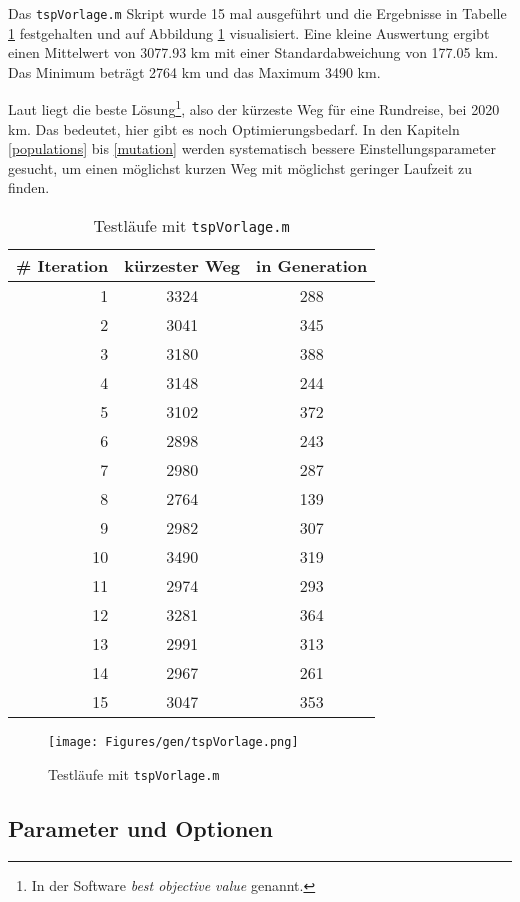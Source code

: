 Das {\tt tspVorlage.m} Skript wurde 15 mal ausgeführt und die Ergebnisse in
Tabelle \ref{testlaeufe} festgehalten und auf Abbildung \ref{fig.testlaeufe}
visualisiert.
Eine kleine Auswertung ergibt einen Mittelwert von 3077.93 km mit
einer Standardabweichung von 177.05 km.
Das Minimum beträgt 2764 km und das Maximum 3490 km.

Laut \cite{aufg} liegt die beste
Lösung\footnote{In der Software \emph{best objective value} genannt.},
also der kürzeste Weg für eine Rundreise, bei 2020 km.
Das bedeutet, hier gibt es noch Optimierungsbedarf.
In den Kapiteln \ref{populations} bis \ref{mutation} werden systematisch bessere Einstellungsparameter
gesucht, um einen möglichst kurzen Weg mit möglichst geringer Laufzeit zu finden.

\begin{table}[h]
\begin{tabular}{ | r | c | c | }
  \hline
  \# Iteration & kürzester Weg & in Generation \\
  \hline
  1  & 3324 & 288 \\
  2  & 3041 & 345 \\
  3  & 3180 & 388 \\
  4  & 3148 & 244 \\
  5  & 3102 & 372 \\
  6  & 2898 & 243 \\
  7  & 2980 & 287 \\
  8  & 2764 & 139 \\
  9  & 2982 & 307 \\
  10 & 3490 & 319 \\
  11 & 2974 & 293 \\
  12 & 3281 & 364 \\
  13 & 2991 & 313 \\
  14 & 2967 & 261 \\
  15 & 3047 & 353 \\
  \hline
\end{tabular}
\caption{Testläufe mit {\tt tspVorlage.m}}\label{testlaeufe}
\end{table}

\begin{figure}[h!]
  \centering
  \texttt{[image: Figures/gen/tspVorlage.png]}
  \caption{Testläufe mit {\tt tspVorlage.m}}\label{fig.testlaeufe}
\end{figure}


\subsection{Parameter und Optionen}\label{sec.param}

